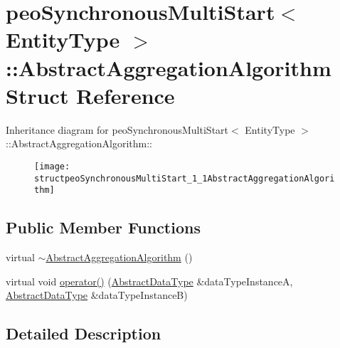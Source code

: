\hypertarget{structpeoSynchronousMultiStart_1_1AbstractAggregationAlgorithm}{
\section{peo\-Synchronous\-Multi\-Start$<$ Entity\-Type $>$::Abstract\-Aggregation\-Algorithm Struct Reference}
\label{structpeoSynchronousMultiStart_1_1AbstractAggregationAlgorithm}
}
Inheritance diagram for peo\-Synchronous\-Multi\-Start$<$ Entity\-Type $>$::Abstract\-Aggregation\-Algorithm::\begin{figure}[H]
\begin{center}
\leavevmode
\texttt{[image: structpeoSynchronousMultiStart\_1\_1AbstractAggregationAlgorithm]}
\end{center}
\end{figure}
\subsection*{Public Member Functions}
\begin{CompactItemize}
\item 
\hypertarget{structpeoSynchronousMultiStart_1_1AbstractAggregationAlgorithm_d5bb9f3712564b788bb7c6da71ef2d3f}{
virtual \hyperlink{structpeoSynchronousMultiStart_1_1AbstractAggregationAlgorithm_d5bb9f3712564b788bb7c6da71ef2d3f}{$\sim$Abstract\-Aggregation\-Algorithm} ()}
\label{structpeoSynchronousMultiStart_1_1AbstractAggregationAlgorithm_d5bb9f3712564b788bb7c6da71ef2d3f}

\item 
\hypertarget{structpeoSynchronousMultiStart_1_1AbstractAggregationAlgorithm_cf9b3275e26f24984c9bb839e7f07ba6}{
virtual void \hyperlink{structpeoSynchronousMultiStart_1_1AbstractAggregationAlgorithm_cf9b3275e26f24984c9bb839e7f07ba6}{operator()} (\hyperlink{structpeoSynchronousMultiStart_1_1AbstractDataType}{Abstract\-Data\-Type} \&data\-Type\-Instance\-A, \hyperlink{structpeoSynchronousMultiStart_1_1AbstractDataType}{Abstract\-Data\-Type} \&data\-Type\-Instance\-B)}
\label{structpeoSynchronousMultiStart_1_1AbstractAggregationAlgorithm_cf9b3275e26f24984c9bb839e7f07ba6}

\end{CompactItemize}


\subsection{Detailed Description}
